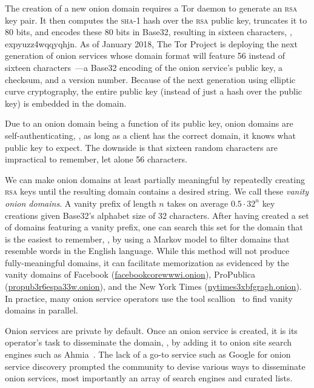 The creation of a new onion domain requires a Tor daemon to generate an
\textsc{rsa} key pair.  It then computes the \textsc{sha}-1 hash over the
\textsc{rsa} public key, truncates it to 80 bits, and encodes these 80 bits in
Base32, resulting in sixteen characters, \eg, expyuzz4wqqyqhjn.  As of January
2018, The Tor Project is deploying the next generation of onion services whose
domain format will feature 56 instead of sixteen
characters~\cite[\S~6]{Mathewson2013a}---a Base32 encoding of the onion
service's public key, a checksum, and a version number.  Because of the next
generation using elliptic curve cryptography, the entire public key (instead of
just a hash over the public key) is embedded in the domain.

Due to an onion domain being a function of its public key, onion domains are
self-authenticating, \ie, as long as a client has the correct domain, it knows
what public key to expect.  The downside is that sixteen random characters are
impractical to remember, let alone 56 characters.

We can make onion domains at least partially meaningful by repeatedly creating
\textsc{rsa} keys until the resulting domain contains a desired string.  We call
these \emph{vanity onion domains}.  A vanity prefix of length $n$ takes on
average $0.5 \cdot 32^n$ key creations given Base32's alphabet size of 32
characters.  After having created a set of domains featuring a vanity prefix,
one can search this set for the domain that is the easiest to remember, \eg, by
using a Markov model to filter domains that resemble words in the English
language.  While this method will not produce fully-meaningful domains, it can
facilitate memorization as evidenced by the vanity domains of Facebook
(\href{https://www.facebookcorewwwi.onion}{facebookcorewwwi.onion}),
ProPublica
(\href{https://www.propub3r6espa33w.onion}{propub3r6espa33w.onion}),
and the New York Times
(\href{https://www.nytimes3xbfgragh.onion}{nytimes3xbfgragh.onion}).  In
practice, many onion service operators use the tool scallion~\cite{scallion} to
find vanity domains in parallel.

Onion services are private by default.  Once an onion service is created, it is
its operator's task to disseminate the domain, \eg, by adding it to onion site
search engines such as Ahmia~\cite{ahmia}.  The lack of a go-to service such as
Google for onion service discovery prompted the community to devise various ways
to disseminate onion services, most importantly an array of search engines and
curated lists.

